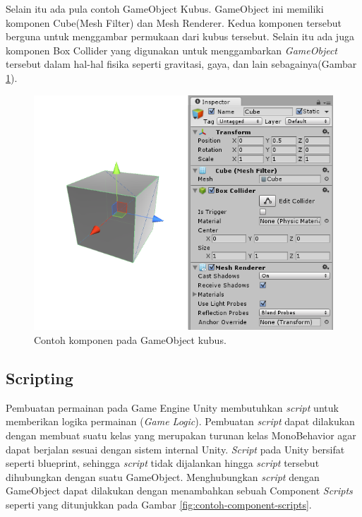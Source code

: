 Selain itu ada pula contoh GameObject Kubus. GameObject ini memiliki komponen Cube(Mesh Filter) dan Mesh Renderer. Kedua komponen tersebut berguna untuk menggambar permukaan dari kubus tersebut. Selain itu ada juga komponen Box Collider yang digunakan untuk menggambarkan \textit{GameObject} tersebut dalam hal-hal fisika seperti gravitasi, gaya, dan lain sebagainya(Gambar \ref{fig:contoh-component-pada-game-object2}).


\begin{figure}[htbp]
\centering
\includegraphics[scale=0.7]{Gambar/contoh-component-pada-game-object2.png}
\caption{Contoh komponen pada GameObject kubus.} 
\label{fig:contoh-component-pada-game-object2}
\end{figure}
 
\subsection{Scripting}

Pembuatan permainan pada Game Engine Unity membutuhkan \textit{script} untuk memberikan logika permainan (\textit{Game Logic}). Pembuatan \textit{script} dapat dilakukan dengan membuat suatu kelas yang merupakan turunan kelas MonoBehavior agar dapat berjalan sesuai dengan sistem internal Unity. \textit{Script} pada Unity bersifat seperti blueprint, sehingga \textit{script} tidak dijalankan hingga \textit{script} tersebut dihubungkan dengan suatu GameObject. Menghubungkan \textit{script} dengan GameObject dapat dilakukan dengan menambahkan sebuah Component \textit{Scripts} seperti yang ditunjukkan pada Gambar \ref{fig:contoh-component-scripts}.

